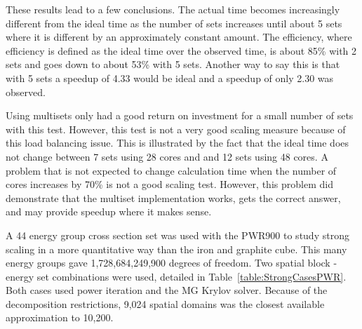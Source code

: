 These results lead to a few conclusions. The actual time becomes increasingly different from the ideal time as the number of sets increases until about 5 sets where it is different by an approximately constant amount. The efficiency, where efficiency is defined as the ideal time over the observed time, is about 85\% with 2 sets and goes down to about 53\% with 5 sets. Another way to say this is that with 5 sets a speedup of 4.33 would be ideal and a speedup of only 2.30 was observed. 

Using multisets only had a good return on investment for a small number of sets with this test. However, this test is not a very good scaling measure because of this load balancing issue. This is illustrated by the fact that the ideal time does not change between 7 sets using 28 cores and and 12 sets using 48 cores. A problem that is not expected to change calculation time when the number of cores increases by 70\% is not a good scaling test. However, this problem did demonstrate that the multiset implementation works, gets the correct answer, and may provide speedup where it makes sense.  

A 44 energy group cross section set was used with the PWR900 to study strong scaling in a more quantitative way than the iron and graphite cube. This many energy groups gave 1,728,684,249,900 degrees of freedom. Two spatial block - energy set combinations were used, detailed in Table~\ref{table:StrongCasesPWR}. Both cases used power iteration and the MG Krylov solver. Because of the decomposition restrictions, 9,024 spatial domains was the closest available approximation to 10,200.

